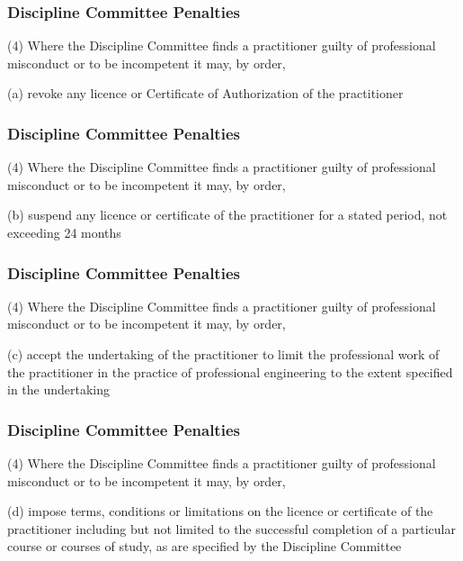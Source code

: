 \begin{frame}
\frametitle{Discipline Committee Penalties}

(4) Where the Discipline Committee finds a practitioner guilty of professional misconduct or to be incompetent it may, by order,

(a) revoke any licence or Certificate of Authorization of the practitioner



\end{frame}

\begin{frame}
\frametitle{Discipline Committee Penalties}

(4) Where the Discipline Committee finds a practitioner guilty of professional misconduct or to be incompetent it may, by order,


(b) suspend any licence or certificate of the practitioner for a stated period, not exceeding 24 months


\end{frame}

\begin{frame}
\frametitle{Discipline Committee Penalties}

(4) Where the Discipline Committee finds a practitioner guilty of professional misconduct or to be incompetent it may, by order,


(c) accept the undertaking of the practitioner to limit the
		professional work of the practitioner in the practice
		of professional engineering to the extent specified in the
		undertaking


\end{frame}

\begin{frame}
\frametitle{Discipline Committee Penalties}

(4) Where the Discipline Committee finds a practitioner guilty of professional misconduct or to be incompetent it may, by order,


(d) impose terms, conditions or limitations on the licence or
 		certificate of the practitioner including but not limited to the
		successful completion of a particular course or courses of
		study, as are specified by the Discipline Committee


\end{frame}

